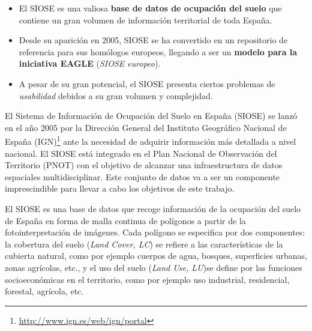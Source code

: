 \begin{graybox}
\begin{itemize}
\item El SIOSE es una valiosa \textbf{base de datos de ocupación del suelo} que contiene un gran volumen de información territorial de toda España.
\item Desde su aparición en 2005, SIOSE se ha convertido en un repositorio de referencia para sus homólogos europeos, llegando a ser un \textbf{modelo para la iniciativa EAGLE} (\textit{SIOSE europeo}). 
\item A pesar de su gran potencial, el SIOSE presenta ciertos problemas de \textit{usabilidad} debidos a su gran volumen y complejidad.
\end{itemize}
\end{graybox}


El Sistema de Información de Ocupación del Suelo en España (SIOSE) se lanzó en el año 2005 por la Dirección General del Instituto Geográfico Nacional de España (IGN)\footnote{\url{http://www.ign.es/web/ign/portal}} ante la necesidad de adquirir información más detallada a nivel nacional. El SIOSE está integrado en el Plan Nacional de Observación del Territorio (PNOT) con el objetivo de alcanzar una infraestructura de datos espaciales multidisciplinar. Este conjunto de datos va a ser un componente imprescindible para llevar a cabo los objetivos de este trabajo.

El SIOSE es una base de datos que recoge información de la ocupación del suelo de España en forma de malla continua de polígonos a partir de la fotointerpretación de imágenes. Cada polígono se especifica por dos componentes: la cobertura del suelo (\textit{Land Cover, LC}) se refiere a las características de la cubierta natural, como por ejemplo cuerpos de agua, bosques, superficies urbanas, zonas agrícolas, etc., y el uso del suelo (\textit{Land Use, LU})se define por las funciones socioeconómicas en el territorio, como por ejemplo uso industrial, residencial, forestal, agrícola, etc.

